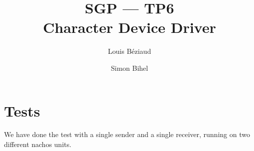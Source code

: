 \documentclass[a4paper,11pt,english]{article}
\title{SGP --- TP6\\Character Device Driver}
\author{Louis Béziaud \and Simon Bihel}
\begin{document}
\maketitle

\section{Tests}

We have done the test with a single sender and a single receiver, running on two different nachos units.

\begin{minipage}[t]{0.45\linewidth}

\end{minipage}
\hfill
\begin{minipage}[t]{0.45\linewidth}

\end{minipage}

\begin{minipage}[t]{0.45\linewidth}

\end{minipage}
\hfill
\begin{minipage}[t]{0.45\linewidth}

\end{minipage}
\end{document}
